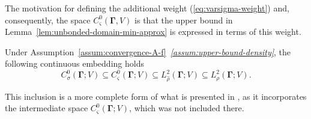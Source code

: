 \documentclass[final,onefignum,onetabnum]{mousaviart}
\begin{document}
	\vspace*{1mm}
	The motivation for defining the additional weight (\ref{eq:varsigma-weight}) and, consequently, the space $C_{\varsigma}^0\left( \boldsymbol{\Gamma}, V \right)$ is that the upper bound in Lemma~\ref{lem:unbonded-domain-min-approx} is expressed in terms of this weight.
			
			\vspace*{1mm}
		\begin{lemma}
			\label{lem:countiuity-embedding}
			Under Assumption~\ref{assum:convergence-A-f}~\textit{\ref{assum:upper-bound-density}}, the following continuous embedding holds
			\begin{equation}
				\label{ineq:countiuity-embedding}
				C_\sigma^0(\boldsymbol{\Gamma}; V) 
				\subseteq
				C_\varsigma^0(\boldsymbol{\Gamma}; V) 
				\subseteq
				L^2_{\hat{\rho}}(\boldsymbol{\Gamma}; V)
				\subseteq
				L^2_{\rho}(\boldsymbol{\Gamma}; V).
			\end{equation}
		\end{lemma}
		
		\vspace*{1mm}
		This inclusion is a more complete form of what is presented in {\cite[Section 3]{Babuska-Nobile-Tempone}}, as it incorporates the intermediate space $C_\varsigma^0(\boldsymbol{\Gamma}; V) $, which was not included there.
		
\end{document}
